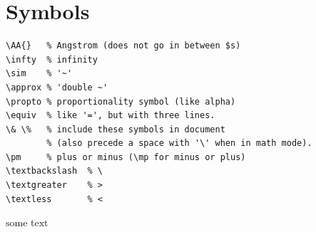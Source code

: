 \documentclass{article}
\begin{document}
\section{Symbols}
\begin{verbatim}
\AA{}   % Angstrom (does not go in between $s)
\infty  % infinity
\sim    % '~'
\approx % 'double ~'
\propto % proportionality symbol (like alpha)
\equiv  % like '=', but with three lines.
\& \%   % include these symbols in document
        % (also precede a space with '\' when in math mode).
\pm     % plus or minus (\mp for minus or plus)
\textbackslash  % \
\textgreater    % >
\textless       % <
\end{verbatim}

$\textrm{some\ text}$    %
\end{document}

